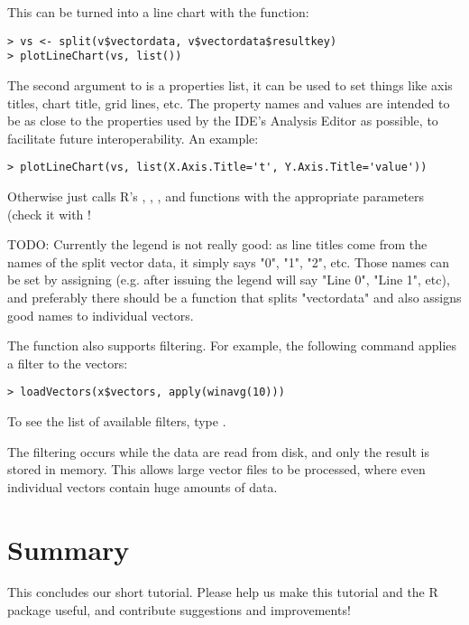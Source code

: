 This can be turned into a line chart with the  function:

\begin{verbatim}
> vs <- split(v$vectordata, v$vectordata$resultkey)
> plotLineChart(vs, list())
\end{verbatim}

The second argument to  is a properties list, it can be used
to set things like axis titles, chart title, grid lines, etc. The property names and 
values are intended to be as close to the properties used by the IDE's Analysis Editor 
as possible, to facilitate future interoperability. An example:

\begin{verbatim}
> plotLineChart(vs, list(X.Axis.Title='t', Y.Axis.Title='value'))
\end{verbatim}

Otherwise  just calls R's , , 
,  and  functions with the appropriate parameters
(check it with !

TODO: Currently the legend is not really good: as line titles come from the names of
the split vector data, it simply says "0", "1", "2", etc. Those names can be set 
by assigning  (e.g. after issuing 
the legend will say "Line 0", "Line 1", etc), and preferably there should be a function
that splits "vectordata" and also assigns good names to individual vectors.

The  function also supports filtering. For example, the following
command applies a  filter to the vectors:

\begin{verbatim}
> loadVectors(x$vectors, apply(winavg(10)))
\end{verbatim}

To see the list of available filters, type .

The filtering occurs while the data are read from disk, and only the result is 
stored in memory. This allows large vector files to be processed, where even individual 
vectors contain huge amounts of data.


\section{Summary}

This concludes our short tutorial. Please help us make this tutorial and the R package useful,
and contribute suggestions and improvements!




